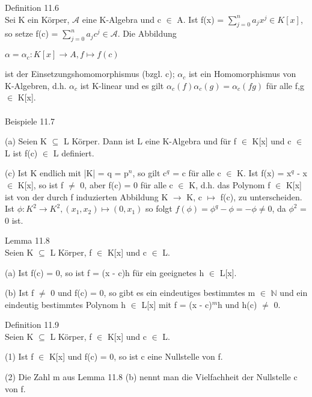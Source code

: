 \documentclass[fontsize=10pt]{scrartcl}
\begin{document}
Definition 11.6\\
Sei K ein Körper, $\mathcal{A}$ eine K-Algebra und c $\in$ A. Ist f(x) = $\sum\nolimits_{j=0}^{n} a_j x^j \in K[x]$, so setze f(c) = $\sum\nolimits_{j=0}^{n} a_j c^j \in \mathcal{A}$. Die Abbildung
\begin{center}
$\alpha = \alpha_c: K[x] \to A, f \mapsto f(c)$
\end{center}
ist der Einsetzungshomomorphismus (bzgl. c); $\alpha_c$ ist ein Homomorphismus von K-Algebren, d.h. $\alpha_c$ ist K-linear und es gilt $\alpha_c(f)\alpha_c(g) = \alpha_c(fg)$ für alle f,g $\in$ K[x].\\
\\
Beispiele 11.7
\begin{compactenum}
\item[(a)] Seien K $\subseteq$ L Körper. Dann ist L eine K-Algebra und für f $\in$ K[x] und c $\in$ L ist f(c) $\in$ L definiert.
\item[(c)] Ist K endlich mit |K| = q = p$^n$, so gilt c$^q$ = c für alle c $\in$ K. Ist f(x) = x$^q$ - x $\in$ K[x], so ist f $\neq$ 0, aber f(c) = 0 für alle c $\in$ K, d.h. das Polynom f $\in$ K[x] ist von der durch f induzierten Abbildung K $\to$ K, c $\mapsto$ f(c), zu unterscheiden. Ist $\phi: K^2 \to K^2, (x_1,x_2) \mapsto (0,x_1)$ so folgt $f(\phi) = \phi^q - \phi = -\phi \neq 0$, da $\phi^2$ = 0 ist.\\
\end{compactenum}
Lemma 11.8\\
Seien K $\subseteq$ L Körper, f $\in$ K[x] und c $\in$ L.
\begin{compactenum}
\item[(a)] Ist f(c) = 0, so ist f = (x - c)h für ein geeignetes h $\in$ L[x].
\item[(b)] Ist f $\neq$ 0 und f(c) = 0, so gibt es ein eindeutiges bestimmtes m $\in$ $\mathbb{N}$ und ein eindeutig bestimmtes Polynom h $\in$ L[x] mit f = (x - c)$^m$h und h(c) $\neq$ 0.\\
\end{compactenum}
Definition 11.9\\
Seien K $\subseteq$ L Körper, f $\in$ K[x] und c $\in$ L.
\begin{compactenum}
\item[(1)] Ist f $\in$ K[x] und f(c) = 0, so ist c eine Nullstelle von f.
\item[(2)] Die Zahl m aus Lemma 11.8 (b) nennt man die Vielfachheit der Nullstelle c von f.\\
\end{compactenum}
\end{document}
